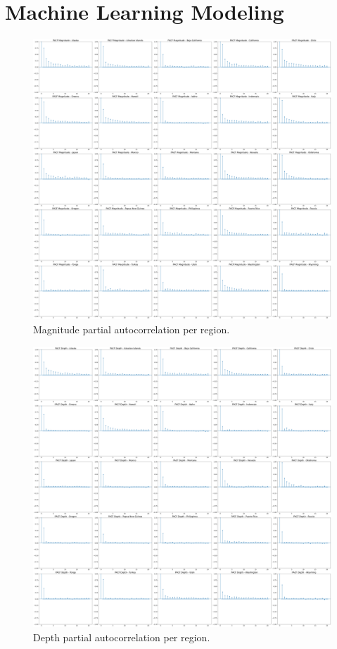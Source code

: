 \chapter{Machine Learning Modeling}

\begin{figure}[hbtp]
    \centering
    \includegraphics[scale=0.15]{img/magnitude-pacf-per-region.png}
    \captionsetup{format=hang}
    \caption{\label{fig:mag-pacf}Magnitude partial autocorrelation per region.}
\end{figure}

\begin{figure}[hbtp]
    \centering
    \includegraphics[scale=0.15]{img/depth-pacf-per-region.png}
    \captionsetup{format=hang}
    \caption{\label{fig:depth-pacf}Depth partial autocorrelation per region.}
\end{figure}

